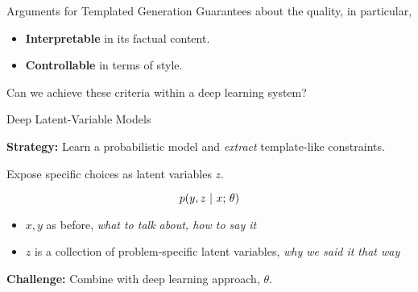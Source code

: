 







\begin{frame}{Arguments for Templated Generation}
Guarantees about the quality, in particular,
\air


\begin{itemize}
\item \textbf{Interpretable} in its factual content.
  \air


  \air

\item \textbf{Controllable} in terms of style.
  \air


\end{itemize}

\begin{center}
  Can we achieve these criteria within a deep learning system?
\end{center}
\pause


\end{frame}


\begin{frame}{Deep Latent-Variable Models}

\textbf{Strategy:} Learn a probabilistic model and \textit{extract} template-like constraints.

\air

  Expose specific choices as latent variables $z$.

\[ p(y, z\ |\ x ; \, \theta)\]

\begin{itemize}
    \item $x, y$ as before, \textit{what to talk about, how to say it}
    \item $z$ is a collection of problem-specific latent variables, \textit{why we said it that way}
\end{itemize}

\pause
\textbf{Challenge:} Combine with deep learning approach, $\theta$.



\end{frame}


